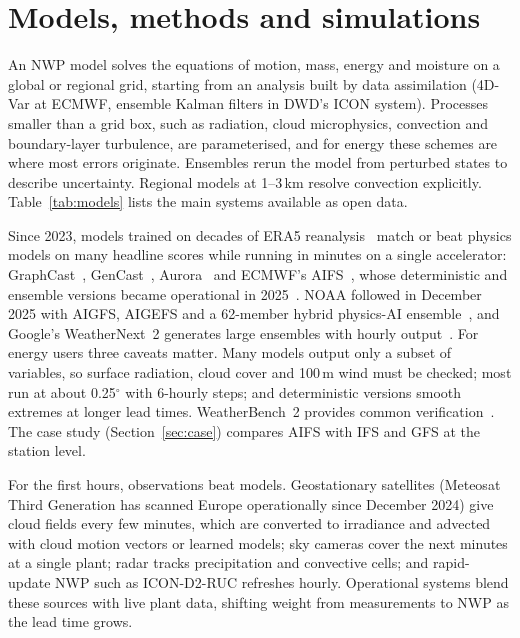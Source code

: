 \section{Models, methods and simulations}
\label{sec:methods}

 An NWP model solves the equations of motion, mass, energy and moisture on a global or regional grid, starting from an analysis built by data assimilation (4D-Var at ECMWF, ensemble Kalman filters in DWD's ICON system). Processes smaller than a grid box, such as radiation, cloud microphysics, convection and boundary-layer turbulence, are parameterised, and for energy these schemes are where most errors originate. Ensembles rerun the model from perturbed states to describe uncertainty. Regional models at 1--3\,km resolve convection explicitly. Table~\ref{tab:models} lists the main systems available as open data.



 Since 2023, models trained on decades of ERA5 reanalysis~\cite{hersbach2020era5} match or beat physics models on many headline scores while running in minutes on a single accelerator: GraphCast~\cite{lam2023graphcast}, GenCast~\cite{price2025gencast}, Aurora~\cite{bodnar2025aurora} and ECMWF's AIFS~\cite{lang2024aifs}, whose deterministic and ensemble versions became operational in 2025~\cite{ecmwf2025aifsens}. NOAA followed in December 2025 with AIGFS, AIGEFS and a 62-member hybrid physics-AI ensemble~\cite{wmo2025noaaai}, and Google's WeatherNext~2 generates large ensembles with hourly output~\cite{google2025weathernext2}. For energy users three caveats matter. Many models output only a subset of variables, so surface radiation, cloud cover and 100\,m wind must be checked; most run at about 0.25$^\circ$ with 6-hourly steps; and deterministic versions smooth extremes at longer lead times. WeatherBench~2 provides common verification~\cite{rasp2024weatherbench2}. The case study (Section~\ref{sec:case}) compares AIFS with IFS and GFS at the station level.

 For the first hours, observations beat models. Geostationary satellites (Meteosat Third Generation has scanned Europe operationally since December 2024) give cloud fields every few minutes, which are converted to irradiance and advected with cloud motion vectors or learned models; sky cameras cover the next minutes at a single plant; radar tracks precipitation and convective cells; and rapid-update NWP such as ICON-D2-RUC refreshes hourly. Operational systems blend these sources with live plant data, shifting weight from measurements to NWP as the lead time grows.

